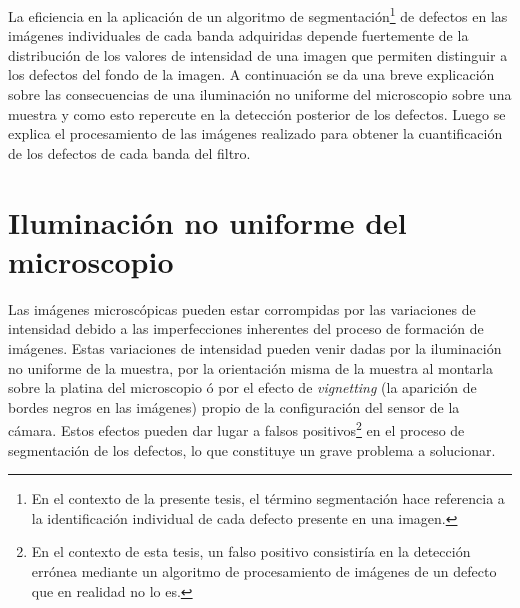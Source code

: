 La eficiencia en la aplicación de un algoritmo de segmentación\footnote{En el contexto de la presente tesis, el término segmentación hace referencia a la identificación individual de cada defecto presente en una imagen.} de defectos en las imágenes individuales de cada banda adquiridas depende fuertemente de la distribución de los valores de intensidad de una imagen que permiten distinguir a los defectos del fondo de la imagen. A continuación se da una breve explicación sobre las consecuencias de una iluminación no uniforme del microscopio sobre una muestra y como esto repercute en la detección posterior de los defectos. Luego se explica el procesamiento de las imágenes realizado para obtener la cuantificación de los defectos de cada banda del filtro.

\singlespacing
\section{Iluminación no uniforme del microscopio}
\label{sec:ilumnou}

\hspace{0.5cm}Las imágenes microscópicas pueden estar corrompidas por las variaciones de intensidad debido a las imperfecciones inherentes del proceso de formación de imágenes. Estas variaciones de intensidad pueden venir dadas por la iluminación no uniforme de la muestra, por la orientación misma de la muestra al montarla sobre la platina del microscopio ó por el efecto de \textit{vignetting} (la aparición de bordes negros en las imágenes) propio de la configuración del sensor de la cámara. Estos efectos pueden dar lugar a falsos positivos\footnote{En el contexto de esta tesis, un falso positivo consistiría en la detección errónea mediante un algoritmo de procesamiento de imágenes de un defecto que en realidad no lo es.} en el proceso de segmentación de los defectos, lo que constituye un grave problema a solucionar.

